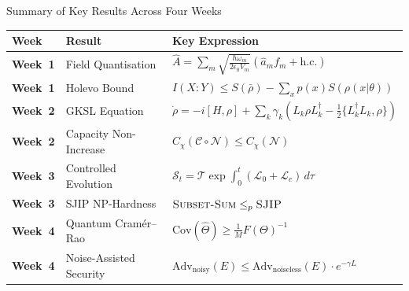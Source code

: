 \documentclass[aspectratio=169,10pt]{beamer}
\begin{document}
\begin{frame}{Summary of Key Results Across Four Weeks}
  \centering
  \renewcommand{\arraystretch}{1.35}
  \begin{tabular}{>{\bfseries\small}l >{\small}l >{\small}l}
    \toprule
    \textbf{Week} & \textbf{Result} & \textbf{Key Expression}\\
    \midrule
    Week~1 & Field Quantisation
      & $\hat A=\sum_m\!\sqrt{\frac{\hbar\omega_m}{2\epsilon_0 V_m}}
        (\hat a_m f_m+\text{h.c.})$\\[2pt]
    Week~1 & Holevo Bound
      & $I(X{:}Y)\le S(\bar\rho)-\sum_x p(x)S(\rho(x|\theta))$\\[2pt]
    Week~2 & GKSL Equation
      & $\dot\rho=-i[H,\rho]+\sum_k\gamma_k(L_k\rho L_k^\dagger
        -\frac{1}{2}\{L_k^\dagger L_k,\rho\})$\\[2pt]
    Week~2 & Capacity Non-Increase
      & $C_\chi(\mathcal{C}\circ\mathcal{N})\le C_\chi(\mathcal{N})$\\[2pt]
    Week~3 & Controlled Evolution
      & $\mathcal{S}_t=\mathcal{T}\exp\int_0^t
        (\mathcal{L}_0+\mathcal{L}_c)\,d\tau$\\[2pt]
    Week~3 & SJIP NP-Hardness
      & $\textsc{Subset-Sum}\le_p\textsc{SJIP}$\\[2pt]
    Week~4 & Quantum Cramér--Rao
      & $\mathrm{Cov}(\hat\Theta)\ge\frac{1}{M}F(\Theta)^{-1}$\\[2pt]
    Week~4 & Noise-Assisted Security
      & $\mathrm{Adv}_{\text{noisy}}(E)\le
        \mathrm{Adv}_{\text{noiseless}}(E)\cdot e^{-\gamma L}$\\
    \bottomrule
  \end{tabular}
\end{frame}
\end{document}
